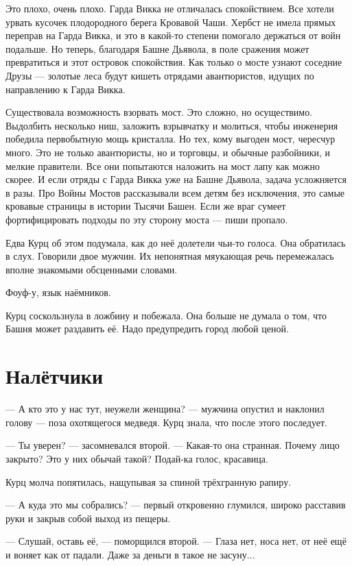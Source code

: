 \documentclass[a4paper,10pt,fleqn]{book}\usepackage{polyglossia}\setdefaultlanguage{english}\setotherlanguage{russian}\defaultfontfeatures{Ligatures=TeX,Mapping=tex-text}\usepackage{xcolor}\definecolor{lightgray}{HTML}{bbbbbb}\color{lightgray}\newcommand{\ml}[3]{\textcolor{black}{#3}}
\begin{document}
Это плохо, очень плохо.
Гарда Викка не отличалась спокойствием.
Все хотели урвать кусочек плодородного берега Кровавой Чаши.
Хербст не имела прямых переправ на Гарда Викка, и это в какой-то степени помогало держаться от войн подальше.
Но теперь, благодаря Башне Дьявола, в поле сражения может превратиться и этот островок спокойствия.
Как только о мосте узнают соседние Друзы --- золотые леса будут кишеть отрядами авантюристов, идущих по направлению к Гарда Викка.

Существовала возможность взорвать мост.
Это сложно, но осуществимо.
Выдолбить несколько ниш, заложить взрывчатку и молиться, чтобы инженерия победила первобытную мощь кристалла.
Но тех, кому выгоден мост, чересчур много.
Это не только авантюристы, но и торговцы, и обычные разбойники, и мелкие правители.
Все они попытаются наложить на мост лапу как можно скорее.
И если отряды с Гарда Викка уже на Башне Дьявола, задача усложняется в разы.
Про Войны Мостов рассказывали всем детям без исключения, это самые кровавые страницы в истории Тысячи Башен.
Если же враг сумеет фортифицировать подходы по эту сторону моста --- пиши пропало.

Едва Курц об этом подумала, как до неё долетели чьи-то голоса.
Она обратилась в слух.
Говорили двое мужчин.
Их непонятная мяукающая речь перемежалась вполне знакомыми обсценными словами.

Фоуф-у, язык наёмников.

Курц соскользнула в ложбину и побежала.
Она больше не думала о том, что Башня может раздавить её.
Надо предупредить город любой ценой.

\section{Налётчики}

--- А кто это у нас тут, неужели женщина? --- мужчина опустил и наклонил голову --- поза охотящегося медведя.
Курц знала, что после этого последует.

--- Ты уверен? --- засомневался второй.
--- Какая-то она странная.
Почему лицо закрыто?
Это у них обычай такой?
Подай-ка голос, красавица.

Курц молча попятилась, нащупывая за спиной трёхгранную рапиру.

--- А куда это мы собрались? --- первый откровенно глумился, широко расставив руки и закрыв собой выход из пещеры.

--- Слушай, оставь её, --- поморщился второй.
--- Глаза нет, носа нет, от неё ещё и воняет как от падали.
Даже за деньги в такое не засуну...
\end{document}
